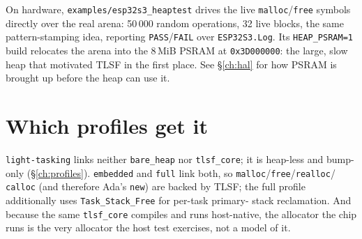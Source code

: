 On hardware, \texttt{examples/esp32s3\_heaptest} drives the live
\texttt{malloc}/\texttt{free} symbols directly over the real arena: 50\,000 random
operations, 32 live blocks, the same pattern-stamping idea, reporting
\texttt{PASS}/\texttt{FAIL} over \texttt{ESP32S3.Log}. Its \texttt{HEAP\_PSRAM=1}
build relocates the arena into the 8\,MiB PSRAM at \texttt{0x3D000000}: the
large, slow heap that motivated TLSF in the first place. See \S\ref{ch:hal} for
how PSRAM is brought up before the heap can use it.

\section{Which profiles get it}

\texttt{light-tasking} links neither \texttt{bare\_heap} nor \texttt{tlsf\_core};
it is heap-less and bump-only (\S\ref{ch:profiles}). \texttt{embedded} and
\texttt{full} link both, so \texttt{malloc}/\texttt{free}/\texttt{realloc}/%
\texttt{calloc} (and therefore Ada's \texttt{new}) are backed by TLSF; the
full profile additionally uses \texttt{Task\_Stack\_Free} for per-task primary-%
stack reclamation. And because the same \texttt{tlsf\_core} compiles and runs
host-native, the allocator the chip runs is the very allocator the host test
exercises, not a model of it.
